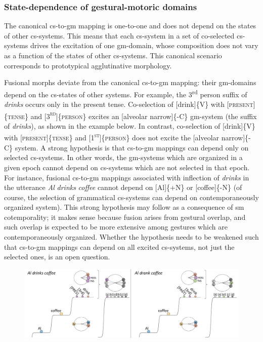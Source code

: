 \subsubsection{State-dependence of gestural-motoric domains}

The canonical cs-to-gm mapping is one-to-one and does not depend on the states of other cs-systems. This means that each cs-system in a set of co-selected cs-systems drives the excitation of one gm-domain, whose composition does not vary as a function of the states of other cs-systems. This canonical scenario corresponds to prototypical agglutinative morphology. 

  Fusional morphs deviate from the canonical cs-to-gm mapping: their gm-domains depend on the cs-states of other systems. For example, the 3\textsuperscript{rd} person suffix of \textit{drinks} occurs only in the present tense. Co-selection of [drink]\{V\} with [\textsc{present}]\{\textsc{tense}\} and [\textsc{3}\textsc{\textsuperscript{rd}}]\{\textsc{person}\} excites an [alveolar narrow]\{-C\} gm-system (the suffix of \textit{drinks}), as shown in the example below. In contrast, co-selection of [drink]\{V\} with [\textsc{present]}\{\textsc{tense}\} and [\textsc{1}\textsc{\textsuperscript{st}}]\{\textsc{person}\} does not excite the [alveolar narrow]\{-C\} system. A strong hypothesis is that cs-to-gm mappings can depend only on selected cs-systems. In other words, the gm-systems which are organized in a given epoch cannot depend on cs-systems which are not selected in that epoch. For instance, fusional cs-to-gm mappings associated with inflection of \textit{drinks} in the utterance \textit{Al} \textit{drinks} \textit{coffee} cannot depend on [Al]\{+N\} or [coffee]\{-N\} (of course, the selection of grammatical cs-systems can depend on contemporaneously organized system). This strong hypothesis may follow as a consequence of sm cotemporality; it makes sense because fusion arises from gestural overlap, and such overlap is expected to be more extensive among gestures which are contemporaneously organized. Whether the hypothesis needs to be weakened such that cs-to-gm mappings can depend on all excited cs-systems, not just the selected ones, is an open question.

  
\begin{figure}
\includegraphics[width=\textwidth]{figures/Tilsen-img69.png}
\caption{\missingcaption}
\label{fig:}
\end{figure}
 

